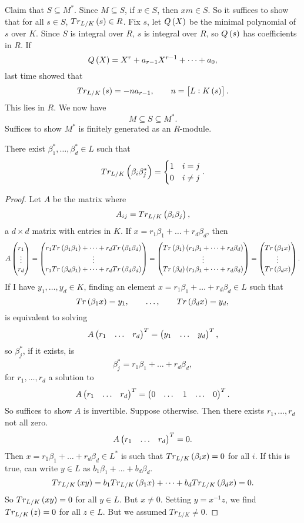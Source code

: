 \pagebreak

Claim that $ S \subseteq M^* $. Since $ M \subseteq S $, if $ x \in S $, then $ xm \in S $. So it suffices to show that for all $ s \in S $, $ Tr_{L / K}\br{s} \in R $. Fix $ s $, let $ Q\br{X} $ be the minimal polynomial of $ s $ over $ K $. Since $ S $ is integral over $ R $, $ s $ is integral over $ R $, so $ Q\br{s} $ has coefficients in $ R $. If
$$ Q\br{X} = X^r + a_{r - 1}X^{r - 1} + \dots + a_0, $$
last time showed that
$$ Tr_{L / K}\br{s} = -na_{r - 1}, \qquad n = \sbr{L : K\br{s}}. $$
This lies in $ R $. We now have
$$ M \subseteq S \subseteq M^*. $$
Suffices to show $ M^* $ is finitely generated as an $ R $-module.

\begin{proposition}
There exist $ \beta_1^*, \dots, \beta_d^* \in L $ such that
$$ Tr_{L / K}\br{\beta_i\beta_j^*} =
\begin{cases}
1 & i = j \\
0 & i \ne j
\end{cases}.
$$
\end{proposition}

\begin{proof}
Let $ A $ be the matrix where
$$ A_{ij} = Tr_{L / K}\br{\beta_i\beta_j}, $$
a $ d \times d $ matrix with entries in $ K $. If $ x = r_1\beta_1 + \dots + r_d\beta_d $, then
$$ A\threebyone{r_1}{\vdots}{r_d} = \threebyone{r_1Tr\br{\beta_1\beta_1} + \dots + r_dTr\br{\beta_1\beta_d}}{\vdots}{r_1Tr\br{\beta_d\beta_1} + \dots + r_dTr\br{\beta_d\beta_d}} = \threebyone{Tr\br{\beta_1}\br{r_1\beta_1 + \dots + r_d\beta_d}}{\vdots}{Tr\br{\beta_d}\br{r_1\beta_1 + \dots + r_d\beta_d}} = \threebyone{Tr\br{\beta_1x}}{\vdots}{Tr\br{\beta_dx}}. $$
If I have $ y_1, \dots, y_d \in K $, finding an element $ x = r_1\beta_1 + \dots + r_d\beta_d \in L $ such that
$$ Tr\br{\beta_1x} = y_1, \qquad \dots, \qquad Tr\br{\beta_dx} = y_d, $$
is equivalent to solving
$$ A\onebythree{r_1}{\dots}{r_d}^T = \onebythree{y_1}{\dots}{y_d}^T, $$
so $ \beta_j^* $, if it exists, is
$$ \beta_j^* = r_1\beta_1 + \dots + r_d\beta_d, $$
for $ r_1, \dots, r_d $ a solution to
$$ A\onebythree{r_1}{\dots}{r_d}^T = \onebythree{0}{\dots & 1 & \dots}{0}^T. $$
So suffices to show $ A $ is invertible. Suppose otherwise. Then there exists $ r_1, \dots, r_d $ not all zero.
$$ A\onebythree{r_1}{\dots}{r_d}^T = 0. $$
Then $ x = r_1\beta_1 + \dots + r_d\beta_d \in L^* $ is such that $ Tr_{L / K}\br{\beta_ix} = 0 $ for all $ i $. If this is true, can write $ y \in L $ as $ b_1\beta_1 + \dots + b_d\beta_d $.
$$ Tr_{L / K}\br{xy} = b_1Tr_{L / K}\br{\beta_1x} + \dots + b_dTr_{L / K}\br{\beta_dx} = 0. $$
So $ Tr_{L / K}\br{xy} = 0 $ for all $ y \in L $. But $ x \ne 0 $. Setting $ y = x^{-1}z $, we find $ Tr_{L / K}\br{z} = 0 $ for all $ z \in L $. But we assumed $ Tr_{L / K} \ne 0 $.
\end{proof}

